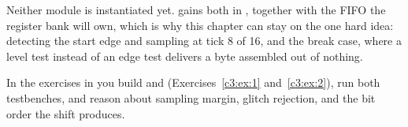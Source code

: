 \noindent Neither module is instantiated yet.  gains both in , together
with the FIFO the register bank will own, which is why this chapter can stay on the one hard idea:
detecting the start edge and sampling at tick 8 of 16, and the break case, where a level test
instead of an edge test delivers a byte assembled out of nothing.

In the exercises in  you build  and 
(Exercises~\ref{c3:ex:1} and~\ref{c3:ex:2}), run both testbenches, and reason about sampling margin,
glitch rejection, and the bit order the shift produces.





